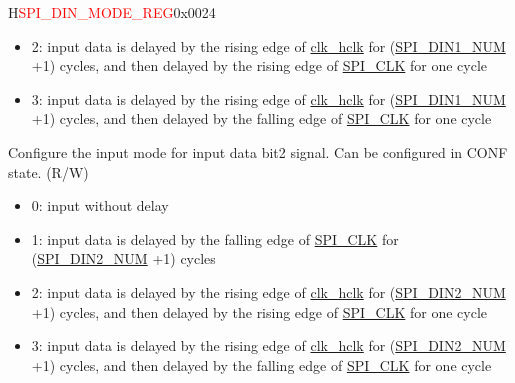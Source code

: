 \begin{register}{H}{\textcolor{red}{SPI\_DIN\_MODE\_REG}}{0x{}0024}
\begin{regdesc}
\begin{reglist}
\begin{itemize}
    \item 2: input data is delayed by the rising edge of \hyperref[clk:clkhclk]{clk\_hclk} for (\hyperref[fielddesc:SPIDIN1NUM]{SPI\_DIN1\_NUM} +1) cycles, and then delayed by the rising edge of \hyperref[clk:SPICLK]{SPI\_CLK} for one cycle

    \item 3: input data is delayed by the rising edge of \hyperref[clk:clkhclk]{clk\_hclk} for (\hyperref[fielddesc:SPIDIN1NUM]{SPI\_DIN1\_NUM} +1) cycles, and then delayed by the falling edge of \hyperref[clk:SPICLK]{SPI\_CLK} for one cycle
\end{itemize}

\label{fielddesc:SPIDIN2MODE}\item [SPI\_DIN2\_MODE] Configure the input mode for input data bit2 signal. Can be configured in CONF state. (R/W)

\begin{itemize}
    \item 0: input without delay
    \item 1: input data is delayed by the falling edge of \hyperref[clk:SPICLK]{SPI\_CLK} for (\hyperref[fielddesc:SPIDIN2NUM]{SPI\_DIN2\_NUM} +1) cycles

    \item 2: input data is delayed by the rising edge of \hyperref[clk:clkhclk]{clk\_hclk} for (\hyperref[fielddesc:SPIDIN2NUM]{SPI\_DIN2\_NUM} +1) cycles, and then delayed by the rising edge of \hyperref[clk:SPICLK]{SPI\_CLK} for one cycle

    \item 3: input data is delayed by the rising edge of \hyperref[clk:clkhclk]{clk\_hclk} for (\hyperref[fielddesc:SPIDIN2NUM]{SPI\_DIN2\_NUM} +1) cycles, and then delayed by the falling edge of \hyperref[clk:SPICLK]{SPI\_CLK} for one cycle
\end{itemize}

\item [Continued on the next page...]
\end{reglist}\end{regdesc}
\end{register}


